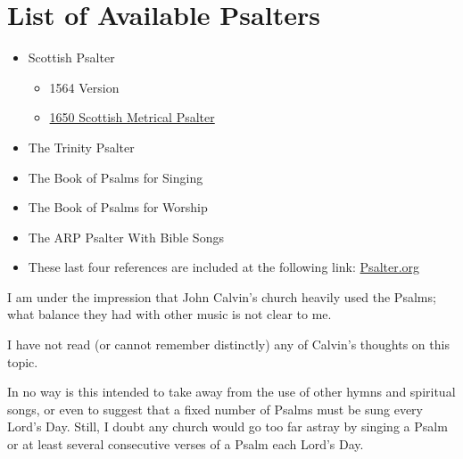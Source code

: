 \documentclass{article}
\begin{document}
\section{List of Available Psalters}


\begin{itemize}

	\item Scottish Psalter
		\begin{itemize}
			\item 1564 Version
			\item \href{https://thewestminsterstandard.org/1650-scottish-metrical-psalter/}{1650 Scottish Metrical Psalter}
		\end{itemize}
	\item The Trinity Psalter
	\item The Book of Psalms for Singing
	\item The Book of Psalms for Worship
	\item The ARP Psalter With Bible Songs
	\item These last four references are included at the following link:
		\href{www.psalter.org}{Psalter.org} 
\end{itemize}



I am under the impression that John Calvin's church heavily used the Psalms; what balance they had with other music is not clear to me.

I have not read (or cannot remember distinctly) any of Calvin's thoughts on this topic.

In no way is this intended to take away from the use of other hymns and spiritual songs, or even to suggest that a fixed number of Psalms must be sung every Lord's Day.  Still, I doubt any church would go too far astray by singing a Psalm or at least several consecutive verses of a Psalm each Lord's Day.
\end{document}
